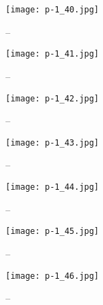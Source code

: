\clearpage


\begin{figure}
    \begin{center}
        \texttt{[image: p-1\_40.jpg]}
        \caption{--}
    \end{center}
\end{figure}

\clearpage


\begin{figure}
    \begin{center}
        \texttt{[image: p-1\_41.jpg]}
        \caption{--}
    \end{center}
\end{figure}

\clearpage


\begin{figure}
    \begin{center}
        \texttt{[image: p-1\_42.jpg]}
        \caption{--}
    \end{center}
\end{figure}

\clearpage


\begin{figure}
    \begin{center}
        \texttt{[image: p-1\_43.jpg]}
        \caption{--}
    \end{center}
\end{figure}

\clearpage


\begin{figure}
    \begin{center}
        \texttt{[image: p-1\_44.jpg]}
        \caption{--}
    \end{center}
\end{figure}

\clearpage


\begin{figure}
    \begin{center}
        \texttt{[image: p-1\_45.jpg]}
        \caption{--}
    \end{center}
\end{figure}

\clearpage


\begin{figure}
    \begin{center}
        \texttt{[image: p-1\_46.jpg]}
        \caption{--}
    \end{center}
\end{figure}

